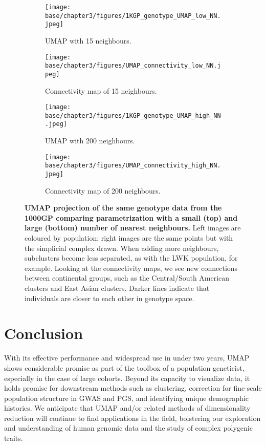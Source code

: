 \clearpage

\begin{figure}[h!]
  \centering
  \begin{subfigure}[b]{0.4\linewidth}
    \texttt{[image: base/chapter3/figures/1KGP\_genotype\_UMAP\_low\_NN.jpeg]}
    \caption{UMAP with 15 neighbours.}
    \label{fig:UMAP_low_NN_1KGP}
  \end{subfigure}
  \begin{subfigure}[b]{0.4\linewidth}
    \texttt{[image: base/chapter3/figures/UMAP\_connectivity\_low\_NN.jpeg]}
    \caption{Connectivity map of 15 neighbours.}
    \label{fig:UMAP_low_NN_connectivity}
  \end{subfigure}
  \begin{subfigure}[b]{0.4\linewidth}
    \texttt{[image: base/chapter3/figures/1KGP\_genotype\_UMAP\_high\_NN.jpeg]}
    \caption{UMAP with 200 neighbours.}
    \label{fig:UMAP_high_NN_1KGP}
  \end{subfigure}
  \begin{subfigure}[b]{0.4\linewidth}
    \texttt{[image: base/chapter3/figures/UMAP\_connectivity\_high\_NN.jpeg]}
    \caption{Connectivity map of 200 neighbours.}
    \label{fig:UMAP_high_NN_connectivity}
  \end{subfigure}
  \caption[UMAP parametrization changes the connectivity of points]{\textbf{UMAP projection of the same genotype data from the 1000GP comparing parametrization with a small (top) and large (bottom) number of nearest neighbours.} Left images are coloured by population; right images are the same points but with the simplicial complex drawn. When adding more neighbours, subclusters become less separated, as with the LWK population, for example. Looking at the connectivity maps, we see new connections between continental groups, such as the Central/South American clusters and East Asian clusters. Darker lines indicate that individuals are closer to each other in genotype space.}
  \label{fig:UMAP_connectivity}
\end{figure}

\clearpage

\section{Conclusion}
With its effective performance and widespread use in under two years, UMAP shows considerable promise as part of the toolbox of a population geneticist, especially in the case of large cohorts. Beyond its capacity to visualize data, it holds promise for downstream methods such as clustering, correction for fine-scale population structure in GWAS and PGS, and identifying unique demographic histories. We anticipate that UMAP and/or related methods of dimensionality reduction will continue to find applications in the field, bolstering our exploration and understanding of human genomic data and the study of complex polygenic traits.

